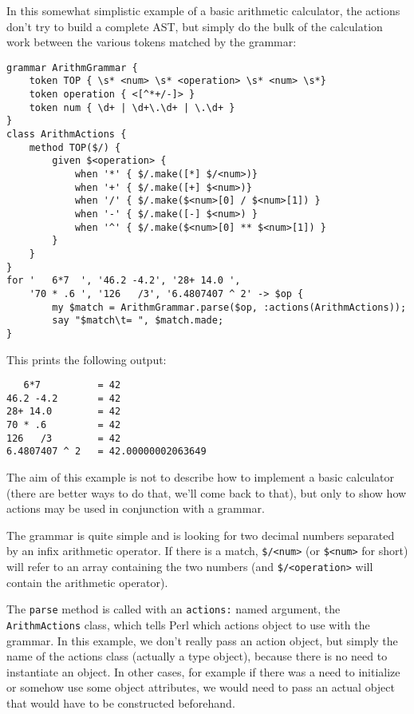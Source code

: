 In this somewhat simplistic example of a basic arithmetic  
calculator, the actions don't try to build a complete AST, but simply 
do the bulk of the calculation work between the various tokens
matched by the grammar:

\begin{verbatim}
grammar ArithmGrammar {
    token TOP { \s* <num> \s* <operation> \s* <num> \s*}
    token operation { <[^*+/-]> }
    token num { \d+ | \d+\.\d+ | \.\d+ }
}
class ArithmActions {
    method TOP($/) {
        given $<operation> {
            when '*' { $/.make([*] $/<num>)}
            when '+' { $/.make([+] $<num>)}
            when '/' { $/.make($<num>[0] / $<num>[1]) }
            when '-' { $/.make([-] $<num>) }
            when '^' { $/.make($<num>[0] ** $<num>[1]) }
        }
    }
}
for '   6*7  ', '46.2 -4.2', '28+ 14.0 ',
    '70 * .6 ', '126   /3', '6.4807407 ^ 2' -> $op {
        my $match = ArithmGrammar.parse($op, :actions(ArithmActions));
        say "$match\t= ", $match.made;
}
\end{verbatim}

This prints the following output:

\begin{verbatim}
   6*7          = 42
46.2 -4.2       = 42
28+ 14.0        = 42
70 * .6         = 42
126   /3        = 42
6.4807407 ^ 2   = 42.00000002063649
\end{verbatim}

The aim of this example is not to describe how to implement 
a basic calculator (there are better ways to do that, we'll 
come back to that), but only to show how actions may be 
used in conjunction with a grammar.

The grammar is quite simple and is looking for two decimal numbers 
separated by an infix arithmetic operator. If there is a 
match, \verb|$/<num>| (or \verb|$<num>| for short) will refer to an 
array containing the two numbers (and \verb|$/<operation>| 
will contain the arithmetic operator).

The {\tt parse} 
method is called with an {\tt actions:} named argument, 
the {\tt ArithmActions} class, which tells Perl which 
actions object to use with the grammar. In this example, we 
don't really pass an action object, but simply the name 
of the actions class (actually a type object), 
because there is no need to instantiate an object. In 
other cases, for example if there was a need to initialize 
or somehow use some object attributes, we would need to pass 
an actual object that would have to be constructed beforehand.

